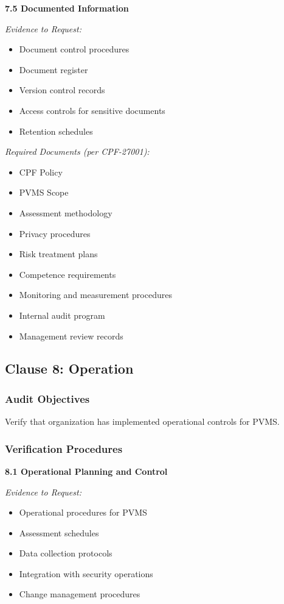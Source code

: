 \documentclass[11pt,a4paper]{article}
\begin{document}
\textbf{7.5 Documented Information}

\textit{Evidence to Request:}
\begin{itemize}
\item Document control procedures
\item Document register
\item Version control records
\item Access controls for sensitive documents
\item Retention schedules
\end{itemize}

\textit{Required Documents (per CPF-27001):}
\begin{itemize}
\item CPF Policy
\item PVMS Scope
\item Assessment methodology
\item Privacy procedures
\item Risk treatment plans
\item Competence requirements
\item Monitoring and measurement procedures
\item Internal audit program
\item Management review records
\end{itemize}

\subsection{Clause 8: Operation}

\subsubsection{Audit Objectives}

Verify that organization has implemented operational controls for PVMS.

\subsubsection{Verification Procedures}

\textbf{8.1 Operational Planning and Control}

\textit{Evidence to Request:}
\begin{itemize}
\item Operational procedures for PVMS
\item Assessment schedules
\item Data collection protocols
\item Integration with security operations
\item Change management procedures
\end{itemize}
\end{document}

